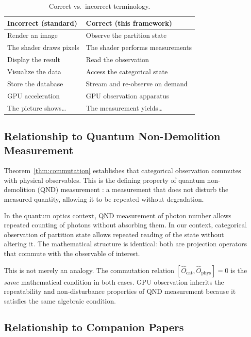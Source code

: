 \documentclass[11pt,twocolumn,a4paper]{article}
\theoremstyle{definition}
\theoremstyle{remark}
\newcommand{\Ocat}{\hat{O}_{\mathrm{cat}}}
\newcommand{\Ophys}{\hat{O}_{\mathrm{phys}}}
\begin{document}
\begin{table}[H]
\centering
\caption{Correct vs.\ incorrect terminology.}
\label{tab:terminology}
\begin{tabular}{@{}ll@{}}
\toprule
\textbf{Incorrect (standard)} & \textbf{Correct (this framework)} \\
\midrule
Render an image & Observe the partition state \\
The shader draws pixels & The shader performs measurements \\
Display the result & Read the observation \\
Visualize the data & Access the categorical state \\
Store the database & Stream and re-observe on demand \\
GPU acceleration & GPU observation apparatus \\
The picture shows\ldots & The measurement yields\ldots \\
\bottomrule
\end{tabular}
\end{table}

\subsection{Relationship to Quantum Non-Demolition Measurement}

Theorem~\ref{thm:commutation} establishes that categorical observation commutes with physical observables. This is the defining property of quantum non-demolition (QND) measurement \citep{braginsky1992}: a measurement that does not disturb the measured quantity, allowing it to be repeated without degradation.

In the quantum optics context, QND measurement of photon number allows repeated counting of photons without absorbing them. In our context, categorical observation of partition state allows repeated reading of the state without altering it. The mathematical structure is identical: both are projection operators that commute with the observable of interest.

This is not merely an analogy. The commutation relation $[\Ocat, \Ophys] = 0$ is the \emph{same} mathematical condition in both cases. GPU observation inherits the repeatability and non-disturbance properties of QND measurement because it satisfies the same algebraic condition.

\subsection{Relationship to Companion Papers}
\end{document}
